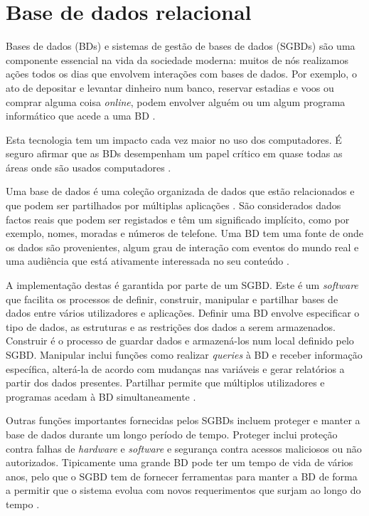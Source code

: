 \documentclass[11pt,twoside,a4paper]{report}
\begin{document}
\section{Base de dados relacional}
Bases de dados (BDs) e sistemas de gestão de bases de dados (SGBDs) são uma componente essencial na vida da sociedade moderna: muitos de nós realizamos ações todos os dias que envolvem interações com bases de dados. Por exemplo, o ato de depositar e levantar dinheiro num banco, reservar estadias e voos ou comprar alguma coisa \textit{online}, podem envolver alguém ou um algum programa informático que acede a uma BD \cite{Elmasri:2010:FDS:1855347}.\par
Esta tecnologia tem um impacto cada vez maior no uso dos computadores. É seguro afirmar que as BDs desempenham um papel crítico em quase todas as áreas onde são usados computadores \cite{Elmasri:2010:FDS:1855347}.\par
Uma base de dados é uma coleção organizada de dados que estão relacionados e que podem ser partilhados por múltiplas aplicações \cite{definicao_base_dados}. São considerados dados factos reais que podem ser registados e têm um significado implícito, como por exemplo, nomes, moradas e números de telefone. Uma BD tem uma fonte de onde os dados são provenientes, algum grau de interação com eventos do mundo real e uma audiência que está ativamente interessada no seu conteúdo \cite{Elmasri:2010:FDS:1855347}.\par
A implementação destas é garantida por parte de um SGBD. Este é um \textit{software} que facilita os processos de definir, construir, manipular e partilhar bases de dados entre vários utilizadores e aplicações. Definir uma BD envolve especificar o tipo de dados, as estruturas e as restrições dos dados a serem armazenados. Construir é o processo de guardar dados e armazená-los num local definido pelo SGBD. Manipular inclui funções como realizar \textit{queries} à BD e receber informação específica, alterá-la de acordo com mudanças nas variáveis e gerar relatórios a partir dos dados presentes. Partilhar permite que múltiplos utilizadores e programas acedam à BD simultaneamente \cite{Elmasri:2010:FDS:1855347}.\par
Outras funções importantes fornecidas pelos SGBDs incluem proteger e manter a base de dados durante um longo período de tempo. Proteger inclui proteção contra falhas de \textit{hardware} e \textit{software} e segurança contra acessos maliciosos ou não autorizados. Tipicamente uma grande BD pode ter um tempo de vida de vários anos, pelo que o SGBD tem de fornecer ferramentas para manter a BD de forma a permitir que o sistema evolua com novos requerimentos que surjam ao longo do tempo \cite{Elmasri:2010:FDS:1855347}.
\end{document}
